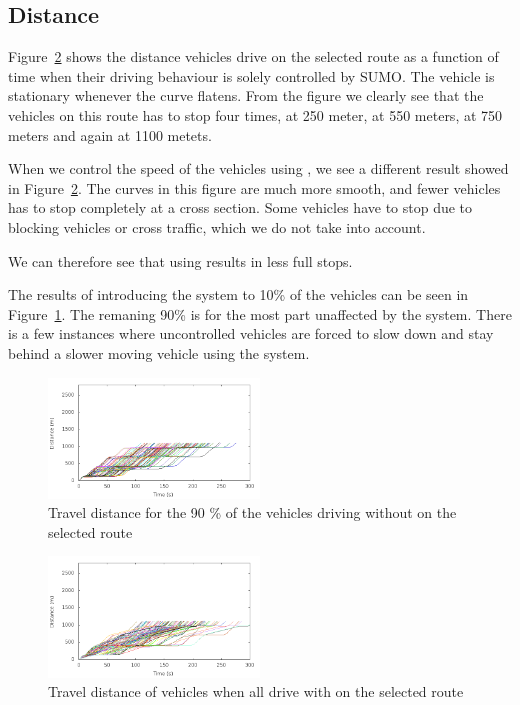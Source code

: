 \subsection{Distance}
Figure~\ref{fig:TestResults:distance100} shows the distance vehicles drive on the selected route as a function of time when their driving behaviour is solely controlled by SUMO. 
The vehicle is stationary whenever the curve flatens.
From the figure we clearly see that the vehicles on this route has to stop four times, at 250 meter, at 550 meters, at 750 meters and again at 1100 metets.

When we control the speed of the vehicles using \tech, we see a different result showed in Figure~\ref{fig:TestResults:distance100}.
The curves in this figure are much more smooth, and fewer vehicles has to stop completely at a cross section.
Some vehicles have to stop due to blocking vehicles or cross traffic, which we do not take into account.

We can therefore see that using \tech results in less full stops.

The results of introducing the system to 10\% of the vehicles can be seen in Figure~\ref{fig:TestResults:distanceUnC10}. 
The remaning 90\% is for the most part unaffected by the system. 
There is a few instances where uncontrolled vehicles are forced to slow down and stay behind a slower moving vehicle using the system.

\begin{figure}[H]
\includegraphics[width=0.5\textwidth]{../images/tp0/distanceUncontrolled10.png}
\caption{Travel distance for the 90 \% of the vehicles driving without \tech on the selected route}
\label{fig:TestResults:distanceUnC10}
\end{figure}

\begin{figure}[H]
\includegraphics[width=0.5\textwidth]{../images/tp0/distanceControlled100.png}
\caption{Travel distance of vehicles when all drive with \tech on the selected route}
\label{fig:TestResults:distance100}
\end{figure}

